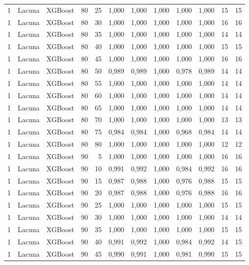 \begin{longtable}{@{}rllrrrrrrrrr@{}}
1 & Lacuna & XGBoost & 80 & 25 & 1,000 & 1,000 & 1,000 & 1,000 & 1,000 & 15 & 15 \\
1 & Lacuna & XGBoost & 80 & 30 & 1,000 & 1,000 & 1,000 & 1,000 & 1,000 & 16 & 16 \\
1 & Lacuna & XGBoost & 80 & 35 & 1,000 & 1,000 & 1,000 & 1,000 & 1,000 & 14 & 14 \\
1 & Lacuna & XGBoost & 80 & 40 & 1,000 & 1,000 & 1,000 & 1,000 & 1,000 & 15 & 15 \\
1 & Lacuna & XGBoost & 80 & 45 & 1,000 & 1,000 & 1,000 & 1,000 & 1,000 & 16 & 16 \\
1 & Lacuna & XGBoost & 80 & 50 & 0,989 & 0,989 & 1,000 & 0,978 & 0,989 & 14 & 14 \\
1 & Lacuna & XGBoost & 80 & 55 & 1,000 & 1,000 & 1,000 & 1,000 & 1,000 & 14 & 14 \\
1 & Lacuna & XGBoost & 80 & 60 & 1,000 & 1,000 & 1,000 & 1,000 & 1,000 & 14 & 14 \\
1 & Lacuna & XGBoost & 80 & 65 & 1,000 & 1,000 & 1,000 & 1,000 & 1,000 & 14 & 14 \\
1 & Lacuna & XGBoost & 80 & 70 & 1,000 & 1,000 & 1,000 & 1,000 & 1,000 & 13 & 13 \\
1 & Lacuna & XGBoost & 80 & 75 & 0,984 & 0,984 & 1,000 & 0,968 & 0,984 & 14 & 14 \\
1 & Lacuna & XGBoost & 80 & 80 & 1,000 & 1,000 & 1,000 & 1,000 & 1,000 & 12 & 12 \\
1 & Lacuna & XGBoost & 90 & 5 & 1,000 & 1,000 & 1,000 & 1,000 & 1,000 & 16 & 16 \\
1 & Lacuna & XGBoost & 90 & 10 & 0,991 & 0,992 & 1,000 & 0,984 & 0,992 & 16 & 16 \\
1 & Lacuna & XGBoost & 90 & 15 & 0,987 & 0,988 & 1,000 & 0,976 & 0,988 & 15 & 15 \\
1 & Lacuna & XGBoost & 90 & 20 & 0,987 & 0,988 & 1,000 & 0,976 & 0,988 & 16 & 16 \\
1 & Lacuna & XGBoost & 90 & 25 & 1,000 & 1,000 & 1,000 & 1,000 & 1,000 & 15 & 15 \\
1 & Lacuna & XGBoost & 90 & 30 & 1,000 & 1,000 & 1,000 & 1,000 & 1,000 & 14 & 14 \\
1 & Lacuna & XGBoost & 90 & 35 & 1,000 & 1,000 & 1,000 & 1,000 & 1,000 & 15 & 15 \\
1 & Lacuna & XGBoost & 90 & 40 & 0,991 & 0,992 & 1,000 & 0,984 & 0,992 & 14 & 15 \\
1 & Lacuna & XGBoost & 90 & 45 & 0,990 & 0,991 & 1,000 & 0,981 & 0,990 & 15 & 15 \\

\end{longtable}
